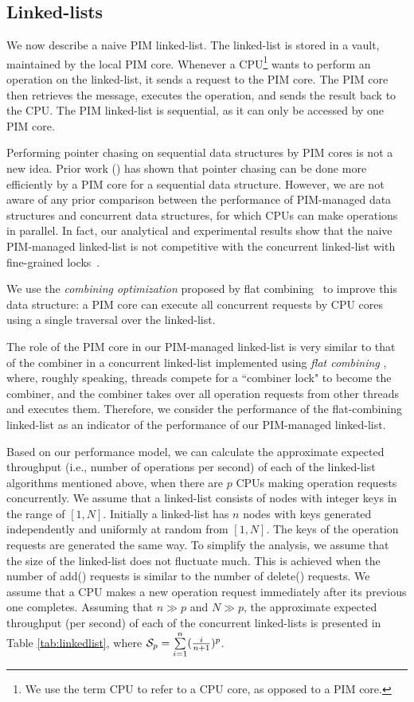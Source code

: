 \subsection{Linked-lists}
\label{section:linked_list}
We now describe a naive PIM linked-list.
The linked-list is stored in a vault, maintained by the local PIM core.
Whenever a CPU\footnote{We use the term CPU to refer to a CPU core, as opposed to a PIM core.} 
wants to perform an operation on the linked-list,
it sends a request to the PIM core.
The PIM core then retrieves the message, executes the operation, and sends the result back to the CPU.
The PIM linked-list is sequential, as it can only be accessed by one PIM core. 

Performing pointer chasing on sequential data structures by PIM cores is not a new idea. 
Prior work (\cite{hsieh2016accelerating, Ahn2015:2, Hashemi:2016}) has shown that 
pointer chasing can be done more efficiently by a PIM core for a sequential data structure.
However, we are not aware of any prior comparison between the performance of
PIM-managed data structures and concurrent data structures, 
for which CPUs can make operations in parallel.
In fact, our analytical and experimental results show that 
the naive PIM-managed linked-list is not competitive with 
the concurrent linked-list with fine-grained locks~\cite{Heller05}.

We use the \textit{combining optimization} proposed by 
flat combining~\cite{Hendler10} to improve this data structure:
a PIM core can execute all concurrent requests by CPU cores using a single 
traversal over the linked-list. 

The role of the PIM core in our PIM-managed linked-list
is very similar to that of the combiner in a concurrent linked-list implemented
using \textit{flat combining} \cite{Hendler10}, where, roughly speaking,
threads compete for a ``combiner lock" to become the combiner, and
the combiner takes over all operation requests from other threads and executes them.
Therefore, we consider the performance of the flat-combining linked-list as an indicator 
of the performance of our PIM-managed linked-list.

Based on our performance model, we can calculate the approximate expected throughput 
(i.e., number of operations per second) of each of the linked-list algorithms mentioned above, 
when there are $p$ CPUs making operation requests concurrently.
We assume that a linked-list consists of nodes with integer keys in the range of $[1, N]$.
Initially a linked-list has $n$ nodes with keys generated independently
and uniformly at random from $[1, N]$.
The keys of the operation requests are generated the same way.
To simplify the analysis, we assume that the size of the linked-list does not fluctuate much. 
This is achieved when the number of add() requests is similar to the number of delete() requests. 
We assume that a CPU makes a new operation request immediately after
its previous one completes.
Assuming that $n \gg p$ and $N \gg p$, the approximate expected throughput (per second) of each
of the concurrent linked-lists is presented in Table \ref{tab:linkedlist}, 
where $\mathcal{S}_{p} = \sum\limits_{i=1}^{n} ({i \over n+1})^{p}$.

